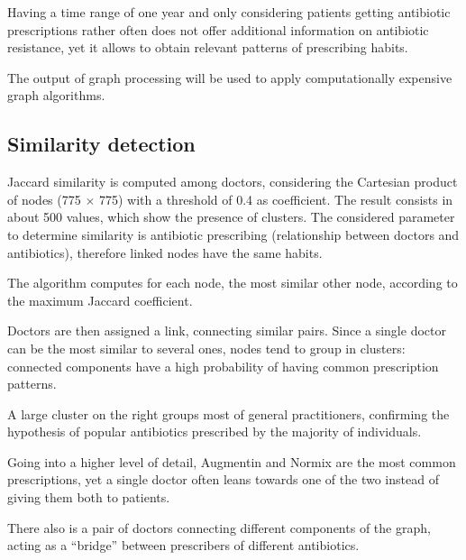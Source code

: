 Having a time range of one year and only considering patients getting antibiotic prescriptions rather often does not offer additional information on antibiotic resistance, yet it allows to obtain relevant patterns of prescribing habits.

The output of graph processing will be used to apply computationally expensive graph algorithms. 

\subsection{Similarity detection}
Jaccard similarity is computed among doctors, considering the Cartesian product of nodes (775 $\times$ 775) with a threshold of 0.4 as coefficient. The result consists in about 500 values, which show the presence of clusters. The considered parameter to determine similarity is antibiotic prescribing (relationship between doctors and antibiotics), therefore linked nodes have the same habits.

The algorithm computes for each node, the most similar other node, according to the maximum Jaccard coefficient.

Doctors are then assigned a link, connecting similar pairs. Since a single doctor can be the most similar to several ones, nodes tend to group in clusters: connected components have a high probability of having common prescription patterns. 

A large cluster on the right groups most of general practitioners, confirming the hypothesis of popular antibiotics prescribed by the majority of individuals.

Going into a higher level of detail, Augmentin and Normix are the most common prescriptions, yet a single doctor often leans towards one of the two instead of giving them both to patients. 

There also is a pair of doctors connecting different components of the graph, acting as a ``bridge'' between prescribers of different antibiotics.\\

